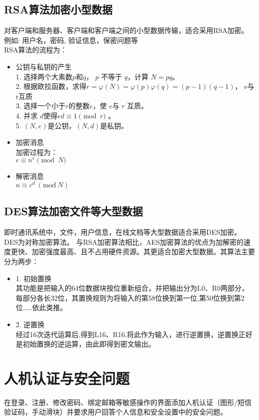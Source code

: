     \subsection{RSA算法加密小型数据}
    对客户端和服务器、客户端和客户端之间的小型数据传输，适合采用RSA加密。\\
    例如: 用户名，密码, 验证信息，保密问题等\\
    RSA算法的流程为：
\begin{itemize}
    

 \item 公钥与私钥的产生 \\

1. 选择两个大素数$ {\displaystyle p}$和$ {\displaystyle {q}}$， ${\displaystyle{p}}$ 不等于 ${\displaystyle {q}}$，计算 ${\displaystyle {N=pq}}$。\\
2. 根据欧拉函数，求得$ {\displaystyle r=\varphi (N)=\varphi (p)\varphi (q)=(p-1)(q-1)} $， e与r互质\\
3. 选择一个小于$ {\displaystyle r} $的整数$ {\displaystyle e} $，使 ${\displaystyle e} $与 ${\displaystyle r}$ 互质。\\
4. 并求 ${\displaystyle d} $使得$ {\displaystyle ed\equiv 1{\pmod {r}}}$ 。\\
5. ${\displaystyle (N,e)}$是公钥，${\displaystyle (N,d)}$是私钥。

\item 加密消息\\
加密过程为：\\
${\displaystyle c\equiv n^{e}{\pmod {N}}}$

\item 解密消息 \\
${\displaystyle n\equiv c^{d}\ (\mathrm {mod} \ N)} $
    \end{itemize}
    \subsection{DES算法加密文件等大型数据}
    即时通讯系统中，文件，用户信息，在线文档等大型数据适合采用DES加密。
    DES为对称加密算法。
    与RSA加密算法相比，AES加密算法的优点为加解密的速度更快、加密强度最高、且不占用硬件资源。其更适合加密大型数据。其算法主要分为两步：
    \begin{itemize}
\item 1. 初始置换\\
其功能是把输入的64位数据块按位重新组合，并把输出分为L0、R0两部分，每部分各长32位，其置换规则为将输入的第58位换到第一位,第50位换到第2位……依此类推。
\item 2. 逆置换\\
经过16次迭代运算后,得到L16、R16,将此作为输入，进行逆置换，逆置换正好是初始置换的逆运算，由此即得到密文输出。
     \end{itemize}
    \section{人机认证与安全问题}
    在登录、注册、修改密码、绑定邮箱等敏感操作的界面添加人机认证（图形/短信验证码，手动滑块）并要求用户回答个人信息和安全设置中的安全问题。
